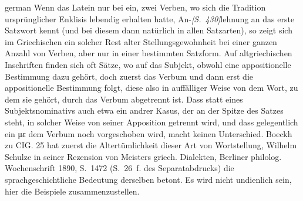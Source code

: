 \begin{otherlanguage*}{german}
Wenn das Latein nur bei ein, zwei Verben, wo sich die Tradition ursprünglicher Enklisis lebendig erhalten hatte, An-\hypertarget{p430}{\emph{[S.~430]}}\label{p430}lehnung an das erste Satzwort kennt (und bei diesem dann natürlich in allen Satzarten), so zeigt sich im Griechischen ein solcher Rest alter Stellungsgewohnheit bei einer ganzen Anzahl von Verben, aber nur in einer bestimmten Satzform. Auf altgriechischen Inschriften finden sich oft Sätze, wo auf das Subjekt, obwohl eine appositionelle Bestimmung dazu gehört, doch zuerst das Verbum und dann erst die appositionelle Bestimmung folgt, diese also in auffälliger Weise von dem Wort, zu dem sie gehört, durch das Verbum abgetrennt ist. Dass statt eines Subjektsnominativs auch etwa ein andrer Kasus, der an der Spitze des Satzes steht, in solcher Weise von seiner Apposition getrennt wird, und dass gelegentlich ein με dem Verbum noch vorgeschoben wird, macht keinen Unterschied. Boeckh zu CIG. 25 hat zuerst die Altertümlichkeit dieser Art von Wortstellung, Wilhelm Schulze in seiner Rezension von Meisters griech. Dialekten, Berliner philolog. Wochenschrift 1890, S.~1472 (S.~26~f. des Separatabdrucks) die sprachgeschichtliche Bedeutung derselben betont. Es wird nicht undienlich sein, hier die Beispiele zusammenzustellen.


\end{otherlanguage*}
